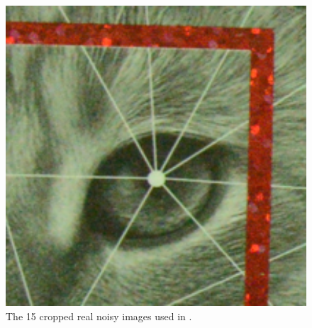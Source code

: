 \documentclass[10pt,twocolumn,letterpaper]{article}
\begin{document}
\begin{figure}
{\begin{minipage}{0.085\textwidth}
\end{minipage}
\begin{minipage}{0.085\textwidth}
\includegraphics[width=1\textwidth]{CC15images/resize_d800_iso6400_3_real.png}
\end{minipage}
}\vspace{-1mm}
\caption{The 15 cropped real noisy images used in \cite{crosschannel2016}.}
\label{fig3}
\vspace{-2mm}
\end{figure}
\end{document}
